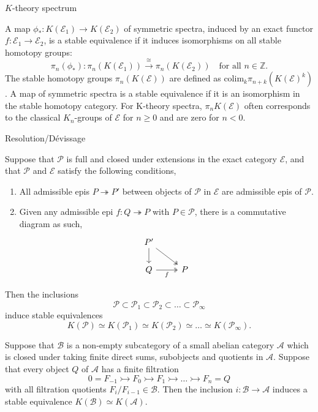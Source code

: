 \documentclass[10pt]{beamer}
\begin{document}
\begin{frame}{\( K \)-theory spectrum	}
		\begin{definition}
		A map $\phi_*: K(\mathcal{E}_1) \to K(\mathcal{E}_2)$ of symmetric spectra, induced by an exact functor $f: \mathcal{E}_1 \to \mathcal{E}_2$, is a {stable equivalence} if it induces isomorphisms on all stable homotopy groups:
		\[ \pi_n(\phi_*): \pi_n(K(\mathcal{E}_1)) \xrightarrow{\cong} \pi_n(K(\mathcal{E}_2)) \quad \text{for all } n \in \mathbb{Z}. \]
		The stable homotopy groups $\pi_n(K(\mathcal{E}))$ are defined as $\mathrm{colim}_k \pi_{n+k}(K(\mathcal{E})^k)$. A map of symmetric spectra is a stable equivalence if it is an isomorphism in the stable homotopy category. For K-theory spectra, $\pi_n K(\mathcal{E})$ often corresponds to the classical $K_n$-groups of $\mathcal{E}$ for $n \ge 0$ and are zero for $n < 0$.
	\end{definition}
\end{frame}
\begin{frame}{Resolution/D\'evissage}
		\begin{theorem}
		Suppose that $\mathcal{P}$ is full and closed under extensions in the exact category $\mathcal{E}$, and that $\mathcal{P}$ and $\mathcal{E}$ satisfy the following conditions,
			\end{theorem}
		\begin{enumerate}
			\item All admissible epis \( P \twoheadrightarrow P' \) between objects of \( \mathcal{P} \) in \( \mathcal{E} \) are admissible epis of \( \mathcal{P} \).
			\item Given any admissible epi \( f:Q \twoheadrightarrow P \) with \( P \in \mathcal{P} \), there is a commutative diagram as such,
			\[\begin{tikzcd}
				{P'} \\
				Q & P
				\arrow[from=1-1, to=2-1]
				\arrow[two heads, from=1-1, to=2-2]
				\arrow["f"', two heads, from=2-1, to=2-2]
			\end{tikzcd}\]
		\end{enumerate} Then the inclusions
		\[ \mathcal{P} \subset \mathcal{P}_1 \subset \mathcal{P}_2 \subset \dots \subset \mathcal{P}_\infty \]
		induce stable equivalences
		\[ K(\mathcal{P}) \simeq K(\mathcal{P}_1) \simeq K(\mathcal{P}_2) \simeq \dots \simeq K(\mathcal{P}_\infty). \]

	\framebreak
	\begin{theorem}
		Suppose that $\mathcal{B}$ is a non-empty subcategory of a small abelian category $\mathcal{A}$ which is closed under taking finite direct sums, subobjects and quotients in $\mathcal{A}$. Suppose that every object $Q$ of $\mathcal{A}$ has a finite filtration
		\[ 0 = F_{-1} \rightarrowtail F_0 \rightarrowtail F_1 \rightarrowtail \dots \rightarrowtail F_n = Q \]
		with all filtration quotients $F_i/F_{i-1} \in \mathcal{B}$. Then the inclusion $i : \mathcal{B} \to \mathcal{A}$ induces a stable equivalence $K(\mathcal{B}) \simeq K(\mathcal{A})$.
	\end{theorem}
\end{frame}
\end{document}
